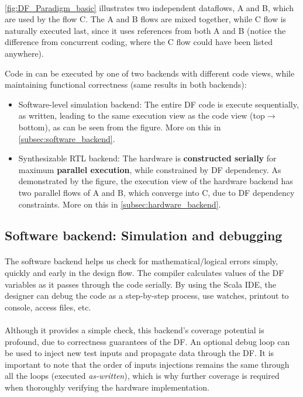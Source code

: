 \paragraph{}\autoref{fig:DF_Paradigm_basic} illustrates two independent dataflows, A and B, which are used by the flow C. The A and B flows are mixed together, while C flow is naturally executed last, since it uses references from both A and B (notice the difference from concurrent coding, where the C flow could have been listed anywhere). 

Code in \cf can be executed by one of two backends with different code views, while maintaining functional correctness (same results in both backends):
\begin{itemize}
	\item Software-level simulation backend: The entire DF code is execute sequentially, as written, leading to the same execution view as the code view (top$\rightarrow$bottom), as can be seen from the figure. More on this in \autoref{subsec:software_backend}.
	\item Synthesizable RTL backend: The hardware is \textbf{constructed serially} for maximum \textbf{parallel execution}, while constrained by DF dependency. As demonstrated by the figure, the execution view of the hardware backend has two parallel flows of A and B, which converge into C, due to DF dependency constraints. More on this in \autoref{subsec:hardware_backend}.
\end{itemize}

\subsection{Software backend: Simulation and debugging}
\label{subsec:software_backend}
\paragraph{}The software backend helps us check for mathematical/logical errors simply, quickly and early in the design flow. The compiler calculates values of the DF variables as it passes through the code serially. By using the Scala IDE, the designer can debug the code as a step-by-step process, use watches, printout to console, access files, etc.  

\paragraph{}Although it provides a simple check, this backend's coverage potential is profound, due to correctness guarantees of the DF. An optional debug loop can be used to inject new test inputs and propagate data through the DF. It is important to note that the order of inputs injections remains the same through all the loops (executed \textit{as-written}), which is why further coverage is required when thoroughly verifying the hardware implementation.

